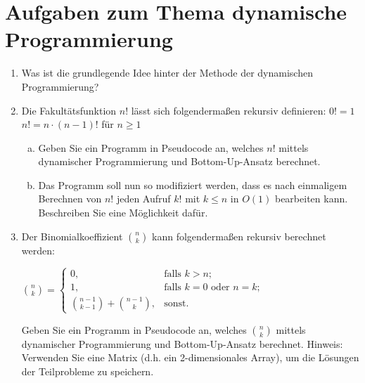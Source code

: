 \documentclass{scrartcl}
\begin{document}
\section*{Aufgaben zum Thema dynamische Programmierung}
\begin{enumerate}[(1)]

\item Was ist die grundlegende Idee hinter der Methode der dynamischen Programmierung?

\item Die Fakultätsfunktion $n!$ lässt sich folgendermaßen rekursiv definieren: \newline
$0! = 1$\newline
$n! = n\cdot(n-1)!$ 	für $n \geq 1$
\begin{enumerate}[(a)]
\item Geben Sie ein Programm in Pseudocode an, welches $n!$  mittels dynamischer Programmierung und Bottom-Up-Ansatz berechnet.
\item Das Programm soll nun so modifiziert werden, dass es nach einmaligem Berechnen von $n!$ jeden Aufruf $k!$ mit $k \leq n$ in $O(1)$ bearbeiten kann. Beschreiben Sie eine Möglichkeit dafür.
\end{enumerate}

\item Der Binomialkoeffizient $\binom{n}{k}$ kann folgendermaßen rekursiv berechnet werden:
\begin{center}
$\binom{n}{k}=\begin{cases}
0, & \text{falls } k > n;\\
1, & \text{falls } k=0 \text{ oder } n=k;\\
\binom{n-1}{k-1} + \binom{n-1}{k}, & \text{sonst.}
\end{cases}$
\end{center}
Geben Sie ein Programm in Pseudocode an, welches $\binom{n}{k}$ mittels dynamischer Programmierung und Bottom-Up-Ansatz berechnet. Hinweis: Verwenden Sie eine Matrix (d.h. ein 2-dimensionales Array), um die Lösungen der Teilprobleme zu speichern.

\end{enumerate}
\end{document}
